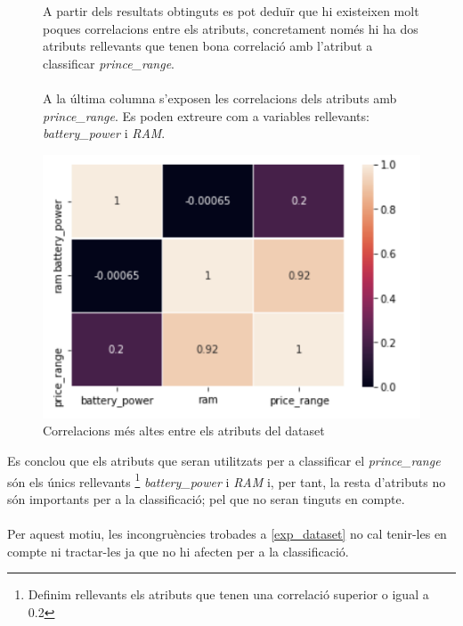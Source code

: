 \documentclass[a4paper, 11pt]{article}
\begin{document}
\begin{figure}[h]
\begin{minipage}{7cm}
A partir dels resultats obtinguts es pot deduïr que hi existeixen molt poques correlacions entre els atributs, concretament només hi ha dos atributs rellevants que tenen bona correlació amb l'atribut a classificar \textit{prince\_range}.\\\\
A la última columna s'exposen les correlacions dels atributs amb \textit{prince\_range}. Es poden extreure com a variables rellevants: \textit{battery\_power} i \textit{RAM}.
\begin{center}
    \includegraphics[width=1\textwidth]{corr.png}
    \caption{Correlacions més altes entre els atributs del dataset}
\end{center}

\end{minipage} %
\end{figure} %
\hspace{-0.6cm}Es conclou que els atributs que seran utilitzats per a classificar el \textit{prince\_range} són els únics rellevants \footnote{Definim rellevants els atributs que tenen una correlació superior o igual a 0.2} \textit{battery\_power} i \textit{RAM} i, per tant, la resta d'atributs no són importants per a la classificació; pel que no seran tinguts en compte.\\\\
Per aquest motiu, les incongruències trobades a \textcolor{blue}{\ref{exp_dataset}} no cal tenir-les en compte ni tractar-les ja que no hi afecten per a la classificació.
\newpage
\end{document}
